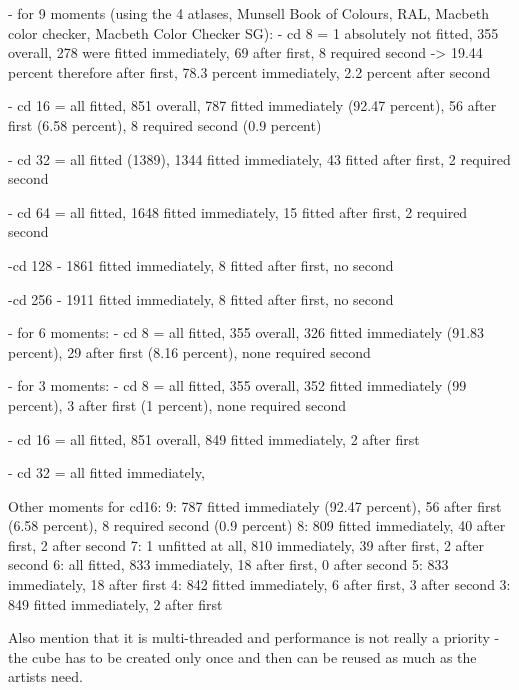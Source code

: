 - for 9 moments (using the 4 atlases, Munsell Book of Colours, RAL, Macbeth color checker, Macbeth Color Checker SG):
	- cd 8 = 1 absolutely not fitted, 355 overall, 278 were fitted immediately, 69 after first,
	8 required second -> 19.44 percent therefore after first, 78.3 percent immediately, 2.2 percent after second 
	
	- cd 16 = all fitted, 851 overall, 787 fitted immediately (92.47 percent), 56 after first (6.58 percent), 8 required second (0.9 percent)
	
	- cd 32 = all fitted (1389), 1344 fitted immediately, 43 fitted after first, 2 required second
	
	- cd 64 = all fitted, 1648 fitted immediately, 15 fitted after first, 2 required second
	 
	 -cd 128 - 1861 fitted immediately, 8 fitted after first, no second
	 
	 -cd 256 - 1911 fitted immediately, 8 fitted after first, no second 
	 
- for 6 moments:
	- cd 8 = all fitted, 355 overall, 326 fitted immediately (91.83 percent), 29 after first (8.16 percent), none required second
	
- for 3 moments:
	- cd 8 = all fitted, 355 overall, 352 fitted immediately (99 percent), 3 after first (1 percent), none required second 
	
	- cd 16 = all fitted, 851 overall, 849 fitted immediately, 2 after first
	
	- cd 32 = all fitted immediately, 

Other moments for cd16:
9: 787 fitted immediately (92.47 percent), 56 after first (6.58 percent), 8 required second (0.9 percent)
8: 809 fitted immediately, 40 after first, 2 after second
7: 1 unfitted at all, 810 immediately, 39 after first, 2 after second
6: all fitted, 833 immediately, 18 after first, 0 after second
5: 833 immediately, 18 after first
4: 842 fitted immediately, 6 after first, 3 after second
3: 849 fitted immediately, 2 after first


Also mention that it is multi-threaded and performance is not really a priority - the cube has to be created only once and then can be reused as much as the artists need.
